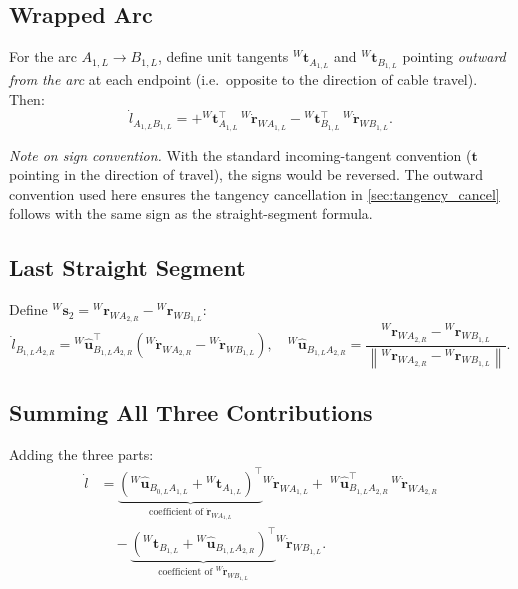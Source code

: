\documentclass[12pt, a4paper]{article}
\theoremstyle{definition}
\begin{document}
\subsection{Wrapped Arc}
\label{sec:arc}

For the arc $A_{1,L} \to B_{1,L}$, define unit tangents ${}^{W}\mathbf{t}_{A_{1,L}}$
and ${}^{W}\mathbf{t}_{B_{1,L}}$ pointing \emph{outward from the arc} at each
endpoint (i.e.\ opposite to the direction of cable travel).  Then:
\begin{equation}
  \dot{l}_{A_{1,L}B_{1,L}}
  = +{}^{W}\mathbf{t}_{A_{1,L}}^\top\,{}^{W}\dot{\mathbf{r}}_{WA_{1,L}}
    - {}^{W}\mathbf{t}_{B_{1,L}}^\top\,{}^{W}\dot{\mathbf{r}}_{WB_{1,L}}.
\end{equation}

\noindent
\textit{Note on sign convention.} With the standard incoming-tangent convention
($\mathbf{t}$ pointing in the direction of travel), the signs would be reversed.
The outward convention used here ensures the tangency cancellation in
\cref{sec:tangency_cancel} follows with the same sign as the straight-segment
formula.

\subsection{Last Straight Segment}
\label{sec:seg2}

Define ${}^{W}\mathbf{s}_2 = {}^{W}\mathbf{r}_{WA_{2,R}} - {}^{W}\mathbf{r}_{WB_{1,L}}$:
\begin{equation}
  \dot{l}_{B_{1,L}A_{2,R}}
  = {}^{W}\hat{\mathbf{u}}_{B_{1,L}A_{2,R}}^\top
    \!\left({}^{W}\dot{\mathbf{r}}_{WA_{2,R}} - {}^{W}\dot{\mathbf{r}}_{WB_{1,L}}\right),
  \quad
  {}^{W}\hat{\mathbf{u}}_{B_{1,L}A_{2,R}}
  = \frac{{}^{W}\mathbf{r}_{WA_{2,R}} - {}^{W}\mathbf{r}_{WB_{1,L}}}
         {\left\|{}^{W}\mathbf{r}_{WA_{2,R}} - {}^{W}\mathbf{r}_{WB_{1,L}}\right\|}.
\end{equation}

\subsection{Summing All Three Contributions}
\label{sec:sum}

Adding the three parts:
\begin{align}
  \dot{l}
  &=
  \underbrace{\left(
    {}^{W}\hat{\mathbf{u}}_{B_{0,L}A_{1,L}}
    + {}^{W}\mathbf{t}_{A_{1,L}}
  \right)^\top}_{\text{coefficient of }\dot{\mathbf{r}}_{WA_{1,L}}}
  {}^{W}\dot{\mathbf{r}}_{WA_{1,L}}
  +\;
  {}^{W}\hat{\mathbf{u}}_{B_{1,L}A_{2,R}}^\top\,{}^{W}\dot{\mathbf{r}}_{WA_{2,R}}
  \nonumber\\[4pt]
  &\quad
  -\underbrace{\left(
    {}^{W}\mathbf{t}_{B_{1,L}}
    + {}^{W}\hat{\mathbf{u}}_{B_{1,L}A_{2,R}}
  \right)^\top}_{\text{coefficient of }{}^{W}\dot{\mathbf{r}}_{WB_{1,L}}}
  {}^{W}\dot{\mathbf{r}}_{WB_{1,L}}.
\end{align}
\end{document}
